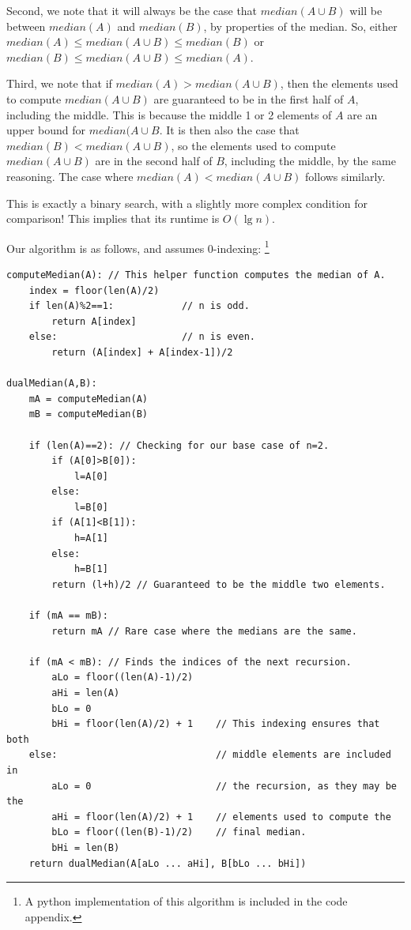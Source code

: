 \documentclass[12pt]{article}
\begin{document}
\begin{enumerate}
    Second, we note that it will always be the case that $median(A\cup B)$ will be between $median(A)$ and $median(B)$, by properties of the median. So, either $median(A) \leq median(A\cup B) \leq median(B)$ or $median(B) \leq 
median(A\cup B) \leq median(A)$.
    
    Third, we note that if $median(A) > median(A\cup B)$, then the elements used to compute $median(A\cup B)$ are guaranteed to be in the first half of $A$, including the middle. This is because the middle 1 or 2 elements of $A$ 
are an upper bound for $median(A\cup B$. It is then also the case that $median(B) < median(A\cup B)$, so the elements used to compute $median(A\cup B)$ are in the second half of $B$, including the middle, by the same reasoning. The 
case where $median(A) < median(A\cup B)$ follows similarly.
    
    This is exactly a binary search, with a slightly more complex condition for comparison! This implies that its runtime is $O(\lg n)$.
    
    Our algorithm is as follows, and assumes 0-indexing: \footnote{A python implementation of this algorithm is included in the code appendix.}
    \begin{Verbatim}
computeMedian(A): // This helper function computes the median of A.
    index = floor(len(A)/2)
    if len(A)%2==1:            // n is odd.
        return A[index] 
    else:                      // n is even.
        return (A[index] + A[index-1])/2

dualMedian(A,B):
    mA = computeMedian(A)
    mB = computeMedian(B)

    if (len(A)==2): // Checking for our base case of n=2.
        if (A[0]>B[0]):
            l=A[0]
        else:
            l=B[0]
        if (A[1]<B[1]):
            h=A[1]
        else:
            h=B[1]
        return (l+h)/2 // Guaranteed to be the middle two elements.

    if (mA == mB):
        return mA // Rare case where the medians are the same.
    
    if (mA < mB): // Finds the indices of the next recursion.
        aLo = floor((len(A)-1)/2)
        aHi = len(A)
        bLo = 0
        bHi = floor(len(A)/2) + 1    // This indexing ensures that both
    else:                            // middle elements are included in
        aLo = 0                      // the recursion, as they may be the
        aHi = floor(len(A)/2) + 1    // elements used to compute the
        bLo = floor((len(B)-1)/2)    // final median.
        bHi = len(B)
    return dualMedian(A[aLo ... aHi], B[bLo ... bHi])
    \end{Verbatim}
    

\end{enumerate}
\end{document}
